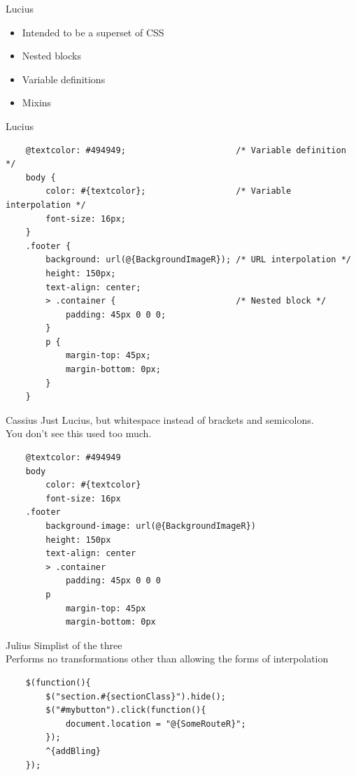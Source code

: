 \documentclass[pdf]{beamer}
\begin{document}
\begin{frame}{Lucius}
  \begin{itemize}
  \item<1-> Intended to be a superset of CSS\\
  \item<2-> Nested blocks\\
  \item<3-> Variable definitions\\
  \item<4-> Mixins\\
  \end{itemize}
\end{frame}

\begin{frame}[fragile]{Lucius}
  \begin{verbatim}
    @textcolor: #494949;                      /* Variable definition */
    body {
        color: #{textcolor};                  /* Variable interpolation */
        font-size: 16px;
    }
    .footer {
        background: url(@{BackgroundImageR}); /* URL interpolation */
        height: 150px;
        text-align: center;
        > .container {                        /* Nested block */
            padding: 45px 0 0 0;
        }
        p {
            margin-top: 45px;
            margin-bottom: 0px;
        }
    }
  \end{verbatim}
\end{frame}

\begin{frame}[fragile]{Cassius}
  Just Lucius, but whitespace instead of brackets and semicolons.\\
  You don't see this used too much.\\
  \begin{verbatim}
    @textcolor: #494949
    body
        color: #{textcolor}
        font-size: 16px
    .footer
        background-image: url(@{BackgroundImageR})
        height: 150px
        text-align: center
        > .container
            padding: 45px 0 0 0
        p
            margin-top: 45px
            margin-bottom: 0px
  \end{verbatim}
\end{frame}

\begin{frame}[fragile]{Julius}
  Simplist of the three\\
  \pause
  Performs no transformations other than allowing the forms of interpolation\\
  \pause
  \begin{verbatim}
    $(function(){
        $("section.#{sectionClass}").hide();
        $("#mybutton").click(function(){
            document.location = "@{SomeRouteR}";
        });
        ^{addBling}
    });
  \end{verbatim}
\end{frame}
\end{document}
